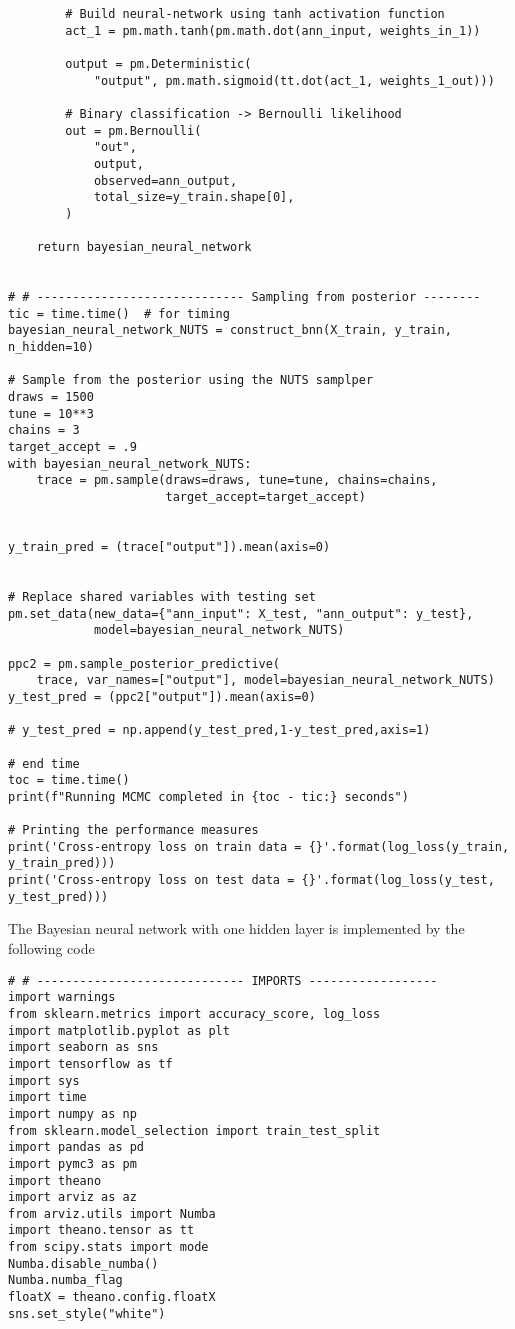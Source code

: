 \begin{appendices}
\begin{lstlisting}
        # Build neural-network using tanh activation function
        act_1 = pm.math.tanh(pm.math.dot(ann_input, weights_in_1))

        output = pm.Deterministic(
            "output", pm.math.sigmoid(tt.dot(act_1, weights_1_out)))

        # Binary classification -> Bernoulli likelihood
        out = pm.Bernoulli(
            "out",
            output,
            observed=ann_output,
            total_size=y_train.shape[0],
        )

    return bayesian_neural_network


# # ----------------------------- Sampling from posterior --------
tic = time.time()  # for timing
bayesian_neural_network_NUTS = construct_bnn(X_train, y_train, n_hidden=10)

# Sample from the posterior using the NUTS samplper
draws = 1500
tune = 10**3
chains = 3
target_accept = .9
with bayesian_neural_network_NUTS:
    trace = pm.sample(draws=draws, tune=tune, chains=chains,
                      target_accept=target_accept)


y_train_pred = (trace["output"]).mean(axis=0)


# Replace shared variables with testing set
pm.set_data(new_data={"ann_input": X_test, "ann_output": y_test},
            model=bayesian_neural_network_NUTS)

ppc2 = pm.sample_posterior_predictive(
    trace, var_names=["output"], model=bayesian_neural_network_NUTS)
y_test_pred = (ppc2["output"]).mean(axis=0)

# y_test_pred = np.append(y_test_pred,1-y_test_pred,axis=1)

# end time
toc = time.time()
print(f"Running MCMC completed in {toc - tic:} seconds")

# Printing the performance measures
print('Cross-entropy loss on train data = {}'.format(log_loss(y_train, y_train_pred)))
print('Cross-entropy loss on test data = {}'.format(log_loss(y_test, y_test_pred)))

\end{lstlisting}
The Bayesian neural network with one hidden layer is implemented by the following code
\begin{lstlisting}
# # ----------------------------- IMPORTS ------------------
import warnings
from sklearn.metrics import accuracy_score, log_loss
import matplotlib.pyplot as plt
import seaborn as sns
import tensorflow as tf
import sys
import time
import numpy as np
from sklearn.model_selection import train_test_split
import pandas as pd
import pymc3 as pm
import theano
import arviz as az
from arviz.utils import Numba
import theano.tensor as tt
from scipy.stats import mode
Numba.disable_numba()
Numba.numba_flag
floatX = theano.config.floatX
sns.set_style("white")



\end{lstlisting}
\end{appendices}
